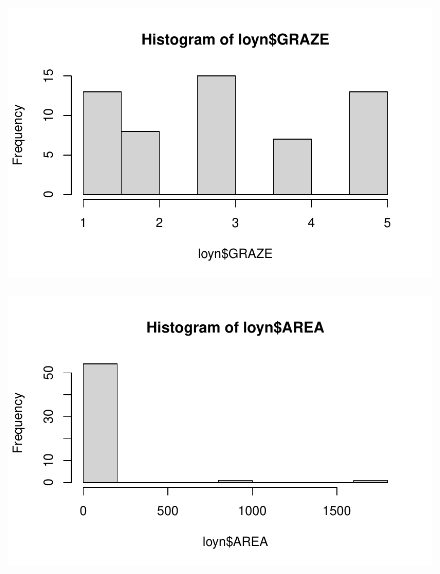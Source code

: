 \documentclass[
  10pt,
  letterpaper,
  DIV=11,
  numbers=noendperiod]{scrartcl}
\newenvironment{Shaded}{\begin{snugshade}}{\end{snugshade}}
\newcommand{\FunctionTok}[1]{\textcolor[rgb]{0.28,0.35,0.67}{#1}}
\newcommand{\NormalTok}[1]{\textcolor[rgb]{0.00,0.23,0.31}{#1}}
\newcommand{\SpecialCharTok}[1]{\textcolor[rgb]{0.37,0.37,0.37}{#1}}
\begin{document}
\begin{Shaded}
\end{Shaded}

\begin{figure}[H]

{\centering \includegraphics{ENVX2001-2024-Lab07_files/figure-pdf/unnamed-chunk-2-4.pdf}

}

\end{figure}

\begin{Shaded}
\end{Shaded}

\begin{figure}[H]

{\centering \includegraphics{ENVX2001-2024-Lab07_files/figure-pdf/unnamed-chunk-2-5.pdf}

}

\end{figure}
\end{document}
